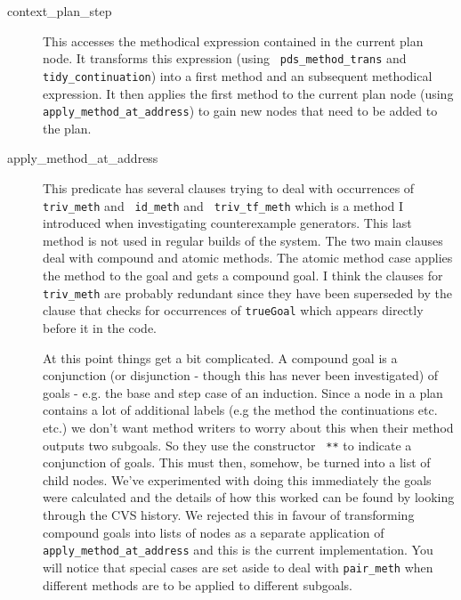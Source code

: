 \begin{description}
  
\item[context\_plan\_step] This accesses
  the methodical expression contained in
  the current plan node.  It transforms this expression (using {\tt
    pds\_method\_trans} and {\tt
    tidy\_continuation}) into a first method
  and an subsequent methodical expression.  It then applies the first
  method to the current plan node (using {\tt
    apply\_method\_at\_address}) to
  gain new nodes that need to be added to the plan.

\item[apply\_method\_at\_address]
  This predicate has several clauses trying to deal with occurrences
  of {\tt triv\_meth} and {\tt
    id\_meth} and {\tt
    triv\_tf\_meth} which is a method I
  introduced when investigating counterexample generators.  This last
  method is not used in regular builds of the system.  The two main
  clauses deal with compound and atomic
  methods.  The atomic
  method case applies the method to the goal and gets a compound
  goal.  I think the clauses for {\tt triv\_meth}
  are probably redundant since they have been superseded by the clause
  that checks for occurrences of {\tt trueGoal} which
  appears directly before it in the code.
  
  At this point things get a bit complicated.  A compound
  goal is a conjunction (or disjunction - though
  this has never been investigated) of goals - e.g. the base and step
  case of an induction.  Since a node in a plan contains a lot of
  additional labels (e.g the method the continuations etc. etc.) we
  don't want method writers to worry about this when their method
  outputs two subgoals.  So they use the constructor {\tt
    **}\index{**} to indicate a conjunction of goals.  This must then,
  somehow, be turned into a list of child nodes.  We've experimented
  with doing this immediately the goals were calculated and the
  details of how this worked can be found by looking through the CVS
  history.  We rejected this in favour of transforming compound goals
  into lists of nodes as a separate application of {\tt
    apply\_method\_at\_address} and
  this is the current implementation.  You will notice that special
  cases are set aside to deal with {\tt pair\_meth}
  when different methods are to be applied to different subgoals.
  

\end{description}
